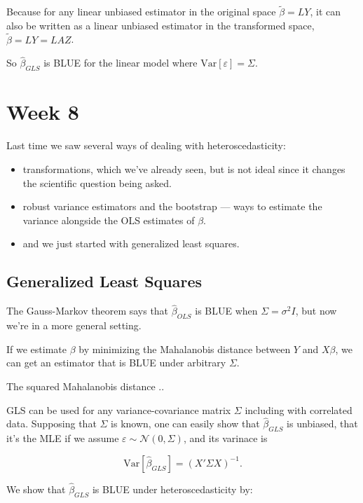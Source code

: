 \documentclass[
  letterpaper,
  DIV=11,
  numbers=noendperiod]{scrreport}
\providecommand{\tightlist}{%
  \setlength{\itemsep}{0pt}\setlength{\parskip}{0pt}}\usepackage{longtable,booktabs,array}
\begin{document}
Because for any linear unbiased estimator in the original space
\(\tilde{\beta} = LY\), it can also be written as a linear unbiased
estimator in the transformed space, \(\tilde{\beta} = LY = LAZ\).

So \(\hat \beta_{GLS}\) is BLUE for the linear model where
\(\text{Var}[\varepsilon] = \Sigma\).


\hypertarget{week-8}{%
\chapter{Week 8}\label{week-8}}

Last time we saw several ways of dealing with heteroscedasticity:

\begin{itemize}
\tightlist
\item
  transformations, which we've already seen, but is not ideal since it
  changes the scientific question being asked.
\item
  robust variance estimators and the bootstrap --- ways to estimate the
  variance alongside the OLS estimates of \(\beta\).
\item
  and we just started with generalized least squares.
\end{itemize}

\hypertarget{generalized-least-squares-1}{%
\section{Generalized Least Squares}\label{generalized-least-squares-1}}

The Gauss-Markov theorem says that \(\hat \beta_{OLS}\) is BLUE when
\(\Sigma = \sigma^2 I\), but now we're in a more general setting.

If we estimate \(\beta\) by minimizing the Mahalanobis distance between
\(Y\) and \(X \beta\), we can get an estimator that is BLUE under
arbitrary \(\Sigma\).

The squared Mahalanobis distance ..

GLS can be used for any variance-covariance matrix \(\Sigma\) including
with correlated data. Supposing that \(\Sigma\) is known, one can easily
show that \(\hat \beta_{GLS}\) is unbiased, that it's the MLE if we
assume \(\varepsilon \sim \mathcal N(0,\Sigma)\), and its varinace is

\[
\text{Var}[\hat \beta_{GLS}] = (X' \Sigma X)^{-1}.
\]

We show that \(\hat \beta_{GLS}\) is BLUE under heteroscedasticity by:
\end{document}
